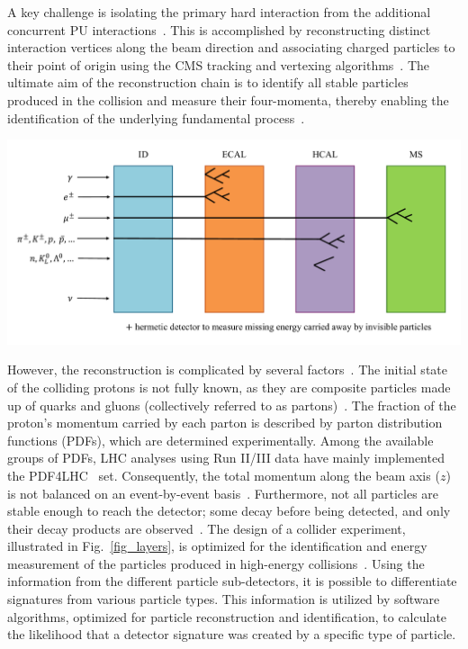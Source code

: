 A key challenge is isolating the primary hard interaction from the additional concurrent PU interactions~\cite{Apollinari2017_HLLHC,Bertolini:2014}. This is accomplished by reconstructing distinct interaction vertices along the beam direction and associating charged particles to their point of origin using the CMS tracking and vertexing algorithms~\cite{CMS:TRK2014,CMS:PF2017}. The ultimate aim of the reconstruction chain is to identify all stable particles produced in the collision and measure their four-momenta, thereby enabling the identification of the underlying fundamental process~\cite{CMS:PF2017}.

\begin{center}
    \includegraphics[width=\textwidth]{Images/Layers.pdf}
    \label{fig_layers}
\end{center}

However, the reconstruction is complicated by several factors~\cite{CMS:2008xjf,CMS:PF2017}. The initial state of the colliding protons is not fully known, as they are composite particles made up of quarks and gluons (collectively referred to as partons)~\cite{Collins:1989,NNPDF:2014otw}. The fraction of the proton's momentum carried by each parton is described by parton distribution functions (PDFs), which are determined experimentally. Among the available groups of PDFs, LHC analyses using Run II/III data have mainly implemented the PDF4LHC~\cite{Butterworth:2015oua,NNPDF:2014otw} set. Consequently, the total momentum along the beam axis ($z$) is not balanced on an event-by-event basis~\cite{Collins:1989}. Furthermore, not all particles are stable enough to reach the detector; some decay before being detected, and only their decay products are observed~\cite{1674-1137-40-10-100001}. The design of a collider experiment, illustrated in Fig.~\ref{fig_layers}, is optimized for the identification and energy measurement of the particles produced in high-energy collisions~\cite{CMS:2008xjf,deFavereau:2013fsa}. Using the information from the different particle sub-detectors, it is possible to differentiate signatures from various particle types. This information is utilized by software algorithms, optimized for particle reconstruction and identification, to calculate the likelihood that a detector signature was  created by a specific type of particle. 

